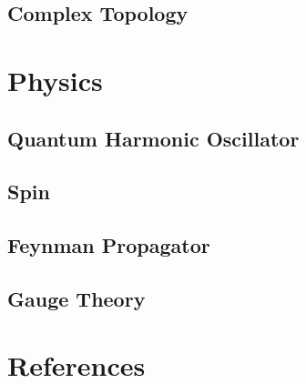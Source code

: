 \documentclass[12pt]{article}
\theoremstyle{definition}
\theoremstyle{remark}
\theoremstyle{example}
\begin{document}
\subsection{Complex Topology}

\section{Physics}

\subsection{Quantum Harmonic Oscillator}

\subsection{Spin}

\subsection{Feynman Propagator}

\subsection{Gauge Theory}



\section{References}
\end{document}
